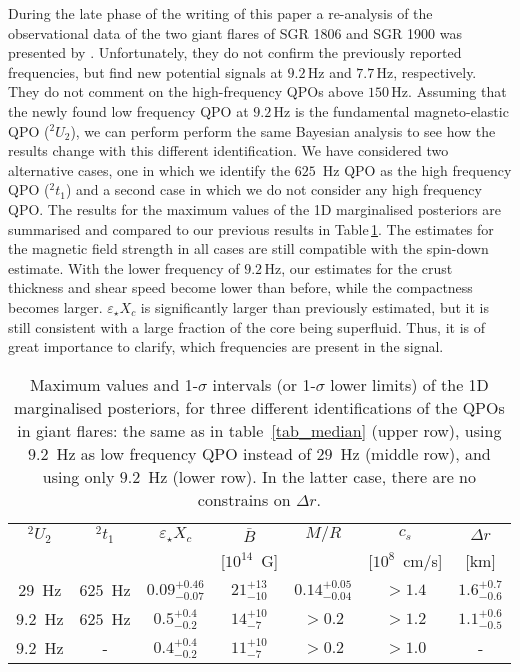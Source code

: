 \documentclass[useAMS,usenatbib]{mnras}
\begin{document}
During the late phase of the writing of this paper a re-analysis of the 
observational data of the two giant flares of SGR 1806 and SGR 1900 was 
presented by \cite{Pumpe2017}. Unfortunately, they do not confirm the 
previously reported frequencies, but find new potential signals at $9.2\,$Hz 
and $7.7\,$Hz, respectively. They do not comment on the 
high-frequency QPOs above $150\,$Hz. Assuming that the newly found low 
frequency QPO at $9.2\,$Hz is the fundamental magneto-elastic QPO ($^2U_2$),
 we can perform perform the same Bayesian analysis to see how the results 
change with this different identification. We have considered two alternative 
cases, one in which we identify the $625$~Hz QPO as the high frequency QPO ($^2t_1$) 
and a second case in which we do not consider any high frequency QPO.
The results for the maximum values of the 1D marginalised posteriors are 
summarised and compared to our previous results in Table\,\ref{tab2}. 
The estimates for the magnetic field strength in 
all cases are still compatible with the spin-down estimate. With the lower 
frequency of $9.2\,$Hz, our estimates for the crust thickness and shear speed 
become lower than before, while the compactness becomes larger. 
$\varepsilon_\star X_c$ is significantly larger than previously 
estimated, but it is still consistent with a large fraction of the core being 
superfluid. Thus, it is of great importance to clarify, which frequencies are 
present in the signal.


\begin{table}
\setlength{\tabcolsep}{3pt}
\begin{tabular}{c c c c c cc}
\hline
$^2U_2$&$^2t_1$&$\varepsilon_\star X_c$ & $\bar B$ & $M/R$ & 
$c_s$ & $\Delta r$  \\
&&& [$10^{14}$~G] & & 
[$10^8$~cm/s] & [km]  \\ \hline
$29$~Hz &
$625$~Hz
&$0.09^{+0.46}_{-0.07}$  
& $21^{+13}_{-10}$ 
 & $0.14^{+0.05}_{-0.04}$  
& $>1.4$
& $1.6^{+0.7}_{-0.6}$\\ 
$9.2$~Hz &
$625$~Hz
&$0.5^{+0.4}_{-0.2}$  
& $14^{+10}_{-7}$ 
 & $>0.2$  
& $>1.2$
& $1.1^{+0.6}_{-0.5}$\\  
$9.2$~Hz &
-
&$0.4^{+0.4}_{-0.2}$  
& $11^{+10}_{-7}$ 
 & $>0.2$  
& $>1.0$
& -\\ \hline
\end{tabular}
\caption{Maximum values and 1-$\sigma$ intervals (or 1-$\sigma$ 
lower limits) of the 1D marginalised 
posteriors, for three different identifications of the QPOs in giant flares: the same as in table~\ref{tab_median} (upper row), 
using $9.2$~Hz as low frequency QPO instead of $29$~Hz (middle row), and  using only $9.2$~Hz (lower row). In the latter
case, there are no constrains on $\Delta r$.
}
\label{tab2}
\end{table}
%
%
\end{document}
